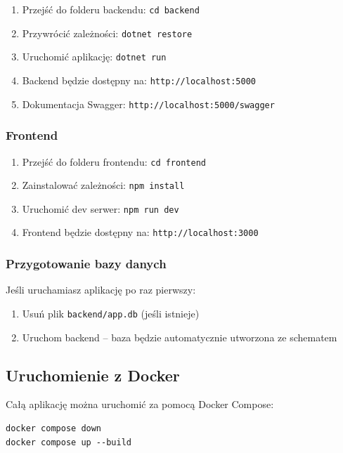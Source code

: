 \documentclass[times]{san}
\begin{document}
\begin{enumerate}
    \item Przejść do folderu backendu: \texttt{cd backend}
    \item Przywrócić zależności: \texttt{dotnet restore}
    \item Uruchomić aplikację: \texttt{dotnet run}
    \item Backend będzie dostępny na: \texttt{http://localhost:5000}
    \item Dokumentacja Swagger: \texttt{http://localhost:5000/swagger}
\end{enumerate}

\subsubsection{Frontend}

\begin{enumerate}
    \item Przejść do folderu frontendu: \texttt{cd frontend}
    \item Zainstalować zależności: \texttt{npm install}
    \item Uruchomić dev serwer: \texttt{npm run dev}
    \item Frontend będzie dostępny na: \texttt{http://localhost:3000}
\end{enumerate}

\subsubsection{Przygotowanie bazy danych}

Jeśli uruchamiasz aplikację po raz pierwszy:

\begin{enumerate}
    \item Usuń plik \texttt{backend/app.db} (jeśli istnieje)
    \item Uruchom backend -- baza będzie automatycznie utworzona ze schematem
\end{enumerate}

\subsection{Uruchomienie z Docker}

Całą aplikację można uruchomić za pomocą Docker Compose:

\begin{verbatim}
docker compose down
docker compose up --build
\end{verbatim}
\end{document}
